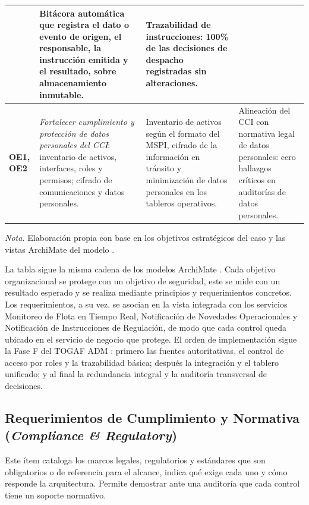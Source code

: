 \begin{table}[H]
\begin{tabularx}{\textwidth}{@{}>{\raggedright\arraybackslash}p{} Y Y Y@{}}
		& Bitácora automática que registra el dato o evento de origen, el responsable, la instrucción emitida y el resultado, sobre almacenamiento inmutable.
		& Trazabilidad de instrucciones: 100\% de las decisiones de despacho registradas sin alteraciones.
		\\
		\midrule
		\textbf{OE1, OE2}
		& \textit{Fortalecer cumplimiento y protección de datos personales del CCI}: inventario de activos, interfaces, roles y permisos; cifrado de comunicaciones y datos personales.
		& Inventario de activos según el formato del MSPI, cifrado de la información en tránsito y minimización de datos personales en los tableros operativos.
		& Alineación del CCI con normativa legal de datos personales: cero hallazgos críticos en auditorías de datos personales.
		\\
		\bottomrule
	\end{tabularx}

	\vspace{0.4em}
	\parbox{\textwidth}{\footnotesize \textit{Nota.} Elaboración propia con base en los objetivos estratégicos del caso y las vistas ArchiMate del modelo \parencite{transmilenio2020peti,transmilenio2026cci,modeloArchimateCCI2026}.}
\end{table}

La tabla sigue la misma cadena de los modelos ArchiMate \parencite{archimate2022}. Cada objetivo organizacional se protege con un objetivo de seguridad, este se mide con un resultado esperado y se realiza mediante principios y requerimientos concretos. Los requerimientos, a su vez, se asocian en la vista integrada con los servicios Monitoreo de Flota en Tiempo Real, Notificación de Novedades Operacionales y Notificación de Instrucciones de Regulación, de modo que cada control queda ubicado en el servicio de negocio que protege. El orden de implementación sigue la Fase F del TOGAF ADM \parencite{togaf2022}: primero las fuentes autoritativas, el control de acceso por roles y la trazabilidad básica; después la integración y el tablero unificado; y al final la redundancia integral y la auditoría transversal de decisiones.

\subsection{Requerimientos de Cumplimiento y Normativa (\textit{Compliance \& Regulatory})}

Este ítem cataloga los marcos legales, regulatorios y estándares que son obligatorios o de referencia para el alcance, indica qué exige cada uno y cómo responde la arquitectura. Permite demostrar ante una auditoría que cada control tiene un soporte normativo.

